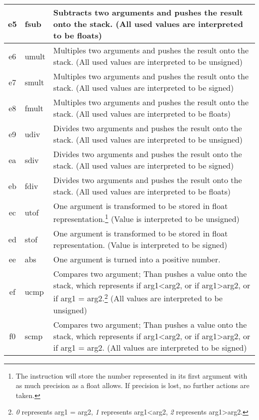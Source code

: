\documentclass[10pt,a4paper]{article}
\makeatletter
\newcommand\footnoteref[1]{\protected@xdef\@thefnmark{\ref{#1}}\@footnotemark}
\makeatother
\begin{document}
\begin{longtable}[c]{c|l|p{9cm}}
		\hline
		\hex e5 & fsub & Subtracts two arguments and pushes the result onto the stack. (All used values are interpreted to be floats) \\		
		\hline
		\hex e6 & umult & Multiples two arguments and pushes the result onto the stack. (All used values are interpreted to be unsigned) \\	
		\hline
		\hex e7 & smult & Multiples two arguments and pushes the result onto the stack. (All used values are interpreted to be signed) \\	
		\hline
		\hex e8 & fmult & Multiples two arguments and pushes the result onto the stack. (All used values are interpreted to be floats) \\
		\hline
		\hex e9 & udiv & Divides two arguments and pushes the result onto the stack. (All used values are interpreted to be unsigned) \\	
		\hline
		\hex ea & sdiv & Divides two arguments and pushes the result onto the stack. (All used values are interpreted to be signed) \\	
		\hline
		\hex eb & fdiv & Divides two arguments and pushes the result onto the stack. (All used values are interpreted to be floats) \\
		\hline
		\hex ec & utof & One argument is transformed to be stored in float representation.\footnote{\label{tof_footnote} The instruction will store the number represented in its first argument with as much precision as a float allows. If precision is lost, no further actions are taken.} (Value is interpreted to be unsigned)\\
		\hline
		\hex ed & stof & One argument is transformed to be stored in float representation.\footnoteref{tof_footnote} (Value is interpreted to be signed)\\
		\hline
		\hex ee & abs & One argument is turned into a positive number. \\
		\hline	
		\hex ef & ucmp & Compares two argument; Than pushes a value onto the stack, which represents if arg1\textless arg2, or if arg1\textgreater arg2, or if arg1 = arg2.\footnote{\label{cmp_footnote} \textit{0} represents arg1 = arg2, \textit{1} represents arg1\textless arg2, \textit{2} represents arg1\textgreater arg2.} (All values are interpreted to be unsigned) \\
		\hline
		\hex f0 & scmp & Compares two argument; Than pushes a value onto the stack, which represents if arg1\textless arg2, or if arg1\textgreater arg2, or if arg1 = arg2.\footnoteref{cmp_footnote} (All values are interpreted to be signed) \\

\end{longtable}
\end{document}
